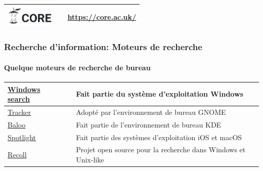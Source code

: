 \documentclass[xcolor=table]{beamer}
\begin{document}
\begin{frame}
\begin{tabular}{L{.3\textwidth}{1cm}cp{.6\textwidth}}
	\includegraphics[height=1cm]{..//img/Bweb02-ri-gmail/core-logo.png} & 
	& 
	\url{https://core.ac.uk/} \\
	
	\hline
	
\end{tabular}


\end{frame}


\begin{frame}
\frametitle{Recherche d'information: Moteurs de recherche}
\framesubtitle{Quelque moteurs de recherche de bureau}

\begin{tabular}{p{}cp{}}
	
	\hline
	
	\href{https://docs.microsoft.com/en-us/windows/win32/search/-search-3x-wds-overview}{Windows search} &
	& 
	Fait partie du système d'exploitation Windows  \\
	
	\hline
	
	\href{https://gitlab.gnome.org/GNOME/tracker}{Tracker} &
	& 
	Adopté par l'environnement de bureau GNOME \\
	
	\hline
	
	\href{https://community.kde.org/Baloo}{Baloo} & 
	& 
	Fait partie de l'environnement de bureau KDE \\
	
	\hline
	
	\href{https://support.apple.com/en-us/HT204014}{Spotlight} & 
	& 
	Fait partie des systèmes d'exploitation iOS et macOS \\
	
	\hline
	
	\href{https://www.lesbonscomptes.com/recoll/}{Recoll} & 
	& 
	Projet open source pour la recherche dans Windows et Unix-like \\
	
	\hline
	
\end{tabular}


\end{frame}
\end{document}
